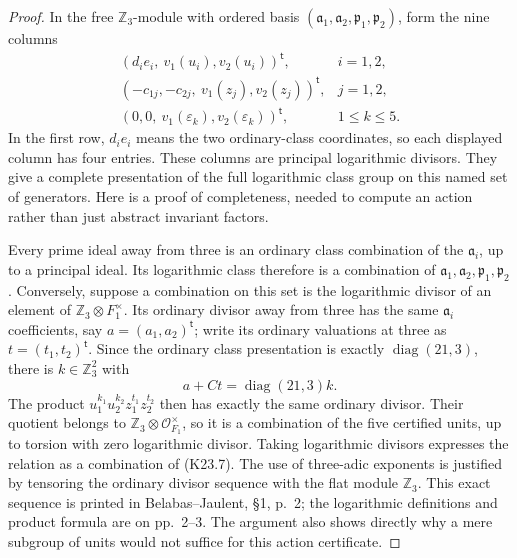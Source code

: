 \begin{proof}
In the free $\mathbb Z_3$-module with ordered basis
$(\mathfrak a_1,\mathfrak a_2,\mathfrak p_1,\mathfrak p_2)$,
form the nine columns
\[
 \begin{array}{ll}
 (d_i e_i,\ v_1(u_i),v_2(u_i))^{\mathsf t}, &i=1,2,\\
 (-c_{1j},-c_{2j},\ v_1(z_j),v_2(z_j))^{\mathsf t}, &j=1,2,\\
 (0,0,\ v_1(\varepsilon_k),v_2(\varepsilon_k))^{\mathsf t},
                                                   &1\leq k\leq5.
 \end{array}                                           \tag{K23.7}
\]
In the first row, $d_i e_i$ means the two ordinary-class
coordinates, so each displayed column has four entries.
These columns are principal logarithmic divisors.
They give a complete presentation of the full logarithmic
class group on this named set of generators.
Here is a proof of completeness, needed to compute an action
rather than just abstract invariant factors.

Every prime ideal away from three is an ordinary class
combination of the $\mathfrak a_i$, up to a principal ideal.
Its logarithmic class therefore is a combination of
$\mathfrak a_1,\mathfrak a_2,\mathfrak p_1,\mathfrak p_2$.
Conversely, suppose a combination on this set is the
logarithmic divisor of an element of
$\mathbb Z_3\otimes F_1^\times$.
Its ordinary divisor away from three has the same
$\mathfrak a_i$ coefficients, say $a=(a_1,a_2)^{\mathsf t}$;
write its ordinary valuations at three as $t=(t_1,t_2)^{\mathsf t}$.
Since the ordinary class presentation is exactly
$\operatorname{diag}(21,3)$, there is $k\in\mathbb Z_3^2$ with
\[
                 a+Ct=\operatorname{diag}(21,3)k.
\]
The product $u_1^{k_1}u_2^{k_2}z_1^{t_1}z_2^{t_2}$
then has exactly the same ordinary divisor.
Their quotient belongs to $\mathbb Z_3\otimes\mathcal O_{F_1}^{\times}$,
so it is a combination of the five certified units,
up to torsion with zero logarithmic divisor.
Taking logarithmic divisors expresses the relation as a
combination of (K23.7).
The use of three-adic exponents is justified by tensoring
the ordinary divisor sequence with the flat module
$\mathbb Z_3$.  This exact sequence is printed in
Belabas--Jaulent, \S1, p.~2; the logarithmic definitions
and product formula are on pp.~2--3.
The argument also shows directly why a mere subgroup of
units would not suffice for this action certificate.


\end{proof}
